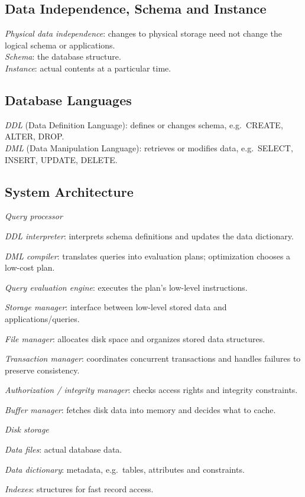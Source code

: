 \subsection*{Data Independence, Schema and Instance}
\emph{Physical data independence}: changes to physical storage need not change the logical schema or applications.\\
\emph{Schema}: the database structure.\\
\emph{Instance}: actual contents at a particular time.

\subsection*{Database Languages}
\emph{DDL} (Data Definition Language): defines or changes schema, e.g.\ CREATE, ALTER, DROP.\\
\emph{DML} (Data Manipulation Language): retrieves or modifies data, e.g.\ SELECT, INSERT, UPDATE, DELETE.

\subsection*{System Architecture}
\emph{Query processor}\\
\begin{enuminline}
\item \emph{DDL interpreter}: interprets schema definitions and updates the data dictionary.
\item \emph{DML compiler}: translates queries into evaluation plans; optimization chooses a low-cost plan.
\item \emph{Query evaluation engine}: executes the plan's low-level instructions.
\end{enuminline}

\emph{Storage manager}: interface between low-level stored data and applications/queries.\\
\begin{enuminline}
\item \emph{File manager}: allocates disk space and organizes stored data structures.
\item \emph{Transaction manager}: coordinates concurrent transactions and handles failures to preserve consistency.
\item \emph{Authorization / integrity manager}: checks access rights and integrity constraints.
\item \emph{Buffer manager}: fetches disk data into memory and decides what to cache.
\end{enuminline}

\emph{Disk storage}\\
\begin{enuminline}
\item \emph{Data files}: actual database data.
\item \emph{Data dictionary}: metadata, e.g.\ tables, attributes and constraints.
\item \emph{Indexes}: structures for fast record access.
\end{enuminline}
